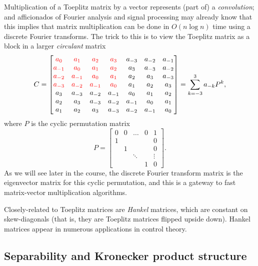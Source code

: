 Multiplication of a Toeplitz matrix by a vector represents (part of) a
{\em convolution}; and afficionados of Fourier analysis and signal processing
may already know that this implies that matrix multiplication can be done
in $O(n \log n)$ time using a discrete Fourier transforms.  The trick to
this is to view the Toeplitz matrix as a block in a larger {\em circulant}
matrix
\[
C =
\begin{bmatrix}
  \color{red}{a_0   } & \color{red}{a_1   } & \color{red}{a_2   } & \color{red}{a_3} & a_{-3} & a_{-2} & a_{-1}\\
  \color{red}{a_{-1}} & \color{red}{a_0   } & \color{red}{a_1   } & \color{red}{a_2} & a_{3} & a_{-3} & a_{-2}\\
  \color{red}{a_{-2}} & \color{red}{a_{-1}} & \color{red}{a_0   } & \color{red}{a_1} & a_{2} & a_{3} & a_{-3} \\
  \color{red}{a_{-3}} & \color{red}{a_{-2}} & \color{red}{a_{-1}} & \color{red}{a_0} & a_{1} & a_{2} & a_{3} \\
  a_3 & a_{-3} & a_{-2} & a_{-1} & a_0 & a_1 & a_2 \\
  a_2 & a_3 & a_{-3} & a_{-2} & a_{-1} & a_0 & a_1 \\
  a_1 & a_2 & a_3 & a_{-3} & a_{-2} & a_{-1} & a_0 \\
\end{bmatrix} =
\sum_{k=-3}^3 a_{-k} P^k,
\]
where $P$ is the cyclic permutation matrix
\[
  P =
  \begin{bmatrix}
  0 & 0 & \dots & 0 & 1 \\
  1 &   &       &   & 0 \\
    & 1 &       &   & 0 \\
    &   & \ddots&   & \vdots \\
    &   &       & 1 & 0
  \end{bmatrix}.
\]
As we will see later in the course, the discrete Fourier transform matrix
is the eigenvector matrix for this cyclic permutation, and this is a
gateway to fast matrix-vector multiplication algorithms.

Closely-related to Toeplitz matrices are {\em Hankel} matrices, which
are constant on skew-diagonals (that is, they are Toeplitz matrices
flipped upside down).  Hankel matrices appear in numerous
applications in control theory.

\subsection{Separability and Kronecker product structure}

